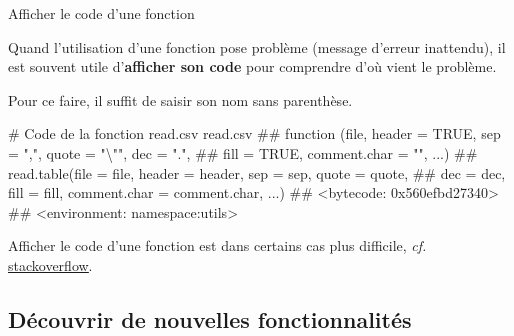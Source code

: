 \documentclass[12pt,ignorenonframetext,]{beamer}
\newenvironment{Shaded}{}{}
\newcommand{\CommentTok}[1]{\textcolor[rgb]{0.00,0.50,0.00}{#1}}
\newcommand{\NormalTok}[1]{#1}
\renewenvironment{Shaded}{\begin{snugshade}}{\end{snugshade}}
\begin{document}
\begin{frame}[fragile]{Afficher le code d'une fonction}

Quand l'utilisation d'une fonction pose problème (message d'erreur
inattendu), il est souvent utile d'\textbf{afficher son code} pour
comprendre d'où vient le problème.

\pause Pour ce faire, il suffit de saisir son nom sans parenthèse.

\footnotesize

\begin{Shaded}
\begin{Highlighting}[]
\CommentTok{# Code de la fonction read.csv}
\NormalTok{read.csv}
\NormalTok{  ## function (file, header = TRUE, sep = ",", quote = "\textbackslash{}"", dec = ".", }
\NormalTok{  ##     fill = TRUE, comment.char = "", ...) }
\NormalTok{  ## read.table(file = file, header = header, sep = sep, quote = quote, }
\NormalTok{  ##     dec = dec, fill = fill, comment.char = comment.char, ...)}
\NormalTok{  ## <bytecode: 0x560efbd27340>}
\NormalTok{  ## <environment: namespace:utils>}
\end{Highlighting}
\end{Shaded}

\pause \normalsize
Afficher le code d'une fonction est dans certains cas plus difficile,
\emph{cf.}
\href{http://stackoverflow.com/questions/19226816/how-can-i-view-the-source-code-for-a-function}{\underline{stackoverflow}}.

\end{frame}

\subsection{Découvrir de nouvelles
fonctionnalités}\label{decouvrir-de-nouvelles-fonctionnalites}
\end{document}
